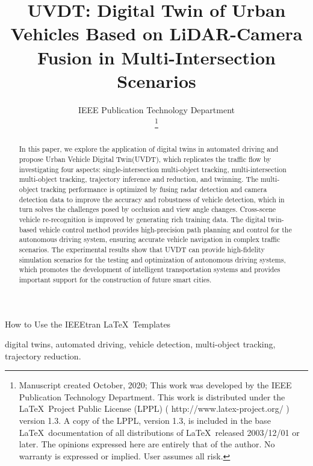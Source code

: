 \documentclass[lettersize,journal]{IEEEtran}
\begin{document}
\title{UVDT: Digital Twin of Urban Vehicles Based on LiDAR-Camera Fusion in Multi-Intersection Scenarios}
\author{IEEE Publication Technology Department

\thanks{Manuscript created October, 2020; This work was developed by the IEEE Publication Technology Department. This work is distributed under the \LaTeX \ Project Public License (LPPL) ( http://www.latex-project.org/ ) version 1.3. A copy of the LPPL, version 1.3, is included in the base \LaTeX \ documentation of all distributions of \LaTeX \ released 2003/12/01 or later. The opinions expressed here are entirely that of the author. No warranty is expressed or implied. User assumes all risk.}}

%
{How to Use the IEEEtran \LaTeX \ Templates}

\maketitle

\begin{abstract}
In this paper, we explore the application of digital twins in automated driving and propose Urban Vehicle Digital Twin(UVDT), which replicates the traffic flow by investigating four aspects: single-intersection multi-object tracking, multi-intersection multi-object tracking, trajectory inference and reduction, and twinning. 
The multi-object tracking performance is optimized by fusing radar detection and camera detection data to improve the accuracy and robustness of vehicle detection, which in turn solves the challenges posed by occlusion and view angle changes. 
Cross-scene vehicle re-recognition is improved by generating rich training data. 
The digital twin-based vehicle control method provides high-precision path planning and control for the autonomous driving system, ensuring accurate vehicle navigation in complex traffic scenarios. 
The experimental results show that UVDT can provide high-fidelity simulation scenarios for the testing and optimization of autonomous driving systems, which promotes the development of intelligent transportation systems and provides important support for the construction of future smart cities.
\end{abstract}

\begin{IEEEkeywords}
digital twins, automated driving, vehicle detection, multi-object tracking, trajectory reduction.
\end{IEEEkeywords}
\end{document}
